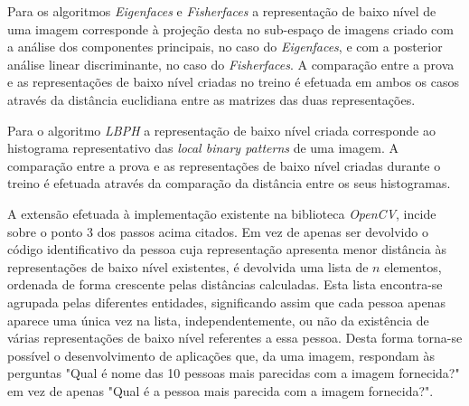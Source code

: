 Para os algoritmos \textit{Eigenfaces} e \textit{Fisherfaces} a representação de baixo nível de uma imagem corresponde à projeção desta no sub-espaço de imagens criado com a análise dos componentes principais, no caso do \textit{Eigenfaces}, e com a posterior análise linear discriminante, no caso do \textit{Fisherfaces}. A comparação entre a prova e as representações de baixo nível criadas no treino é efetuada em ambos os casos através da distância euclidiana entre as matrizes das duas representações.

Para o algoritmo \textit{LBPH} a representação de baixo nível criada corresponde ao histograma representativo das \textit{local binary patterns} de uma imagem. A comparação entre a prova e as representações de baixo nível criadas durante o treino é efetuada através da comparação da distância entre os seus histogramas.

A extensão efetuada à implementação existente na biblioteca \textit{OpenCV}, incide sobre o ponto 3 dos passos acima citados. Em vez de apenas ser devolvido o código identificativo da pessoa cuja representação apresenta menor distância às representações de baixo nível existentes, é devolvida uma lista de $n$ elementos, ordenada de forma crescente pelas distâncias calculadas. Esta lista encontra-se agrupada pelas diferentes entidades, significando assim que cada pessoa apenas aparece uma única vez na lista, independentemente, ou não da existência de várias representações de baixo nível referentes a essa pessoa. Desta forma torna-se possível o desenvolvimento de aplicações que, da uma imagem, respondam às perguntas "Qual é nome das 10 pessoas mais parecidas com a imagem fornecida?" em vez de apenas "Qual é a pessoa mais parecida com a imagem fornecida?".